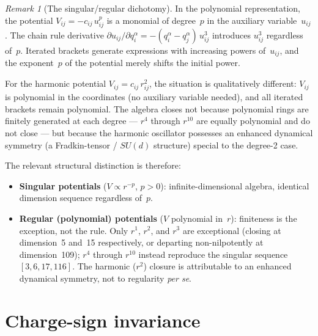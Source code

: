 \documentclass[11pt,a4paper]{article}
\theoremstyle{remark}
\newtheorem{remark}[theorem]{Remark}
\begin{document}
\begin{remark}[The singular/regular dichotomy]
In the polynomial representation, the potential
$V_{ij} = -c_{ij}\, u_{ij}^p$ is a monomial of degree~$p$
in the auxiliary variable~$u_{ij}$.  The chain rule
derivative $\partial u_{ij} / \partial q_i^\alpha =
-(q_i^\alpha - q_j^\alpha)\, u_{ij}^3$ introduces
$u_{ij}^3$ regardless of~$p$.  Iterated brackets
generate expressions with increasing powers of~$u_{ij}$,
and the exponent~$p$ of the potential merely shifts the
initial power.

For the harmonic potential $V_{ij} = c_{ij}\, r_{ij}^2$,
the situation is qualitatively different: $V_{ij}$ is
polynomial in the coordinates (no auxiliary variable
needed), and all iterated brackets remain polynomial.
The algebra closes not because polynomial rings are
finitely generated at each degree --- $r^4$ through
$r^{10}$ are equally polynomial and do not close --- but
because the harmonic oscillator possesses an enhanced
dynamical symmetry (a Fradkin-tensor / $SU(d)$ structure)
special to the degree-2 case.

The relevant structural distinction is therefore:
\begin{itemize}[nosep]
  \item \textbf{Singular potentials} ($V \propto r^{-p}$,
    $p > 0$): infinite-dimensional algebra, identical
    dimension sequence regardless of~$p$.
  \item \textbf{Regular (polynomial) potentials} ($V$
    polynomial in~$r$): finiteness is the exception, not
    the rule.  Only $r^1$, $r^2$, and $r^3$ are exceptional
    (closing at dimension~5 and~15 respectively, or
    departing non-nilpotently at dimension~109); $r^4$
    through $r^{10}$ instead reproduce the singular
    sequence $[3, 6, 17, 116]$.  The harmonic ($r^2$)
    closure is attributable to an enhanced dynamical
    symmetry, not to regularity \emph{per se}.
\end{itemize}
\end{remark}


\section{Charge-sign invariance}
\label{sec:charge}
\end{document}
